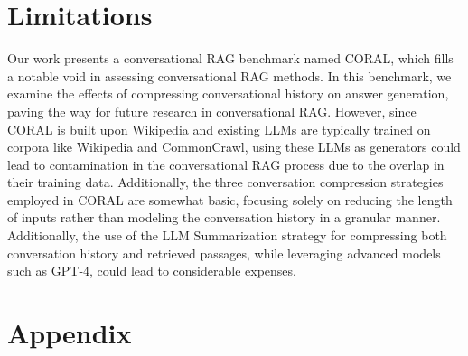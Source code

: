 \documentclass[11pt]{article}
\begin{document}
\section*{Limitations}

Our work presents a conversational RAG benchmark named CORAL, which fills a notable void in assessing conversational RAG methods. In this benchmark, we examine the effects of compressing conversational history on answer generation, paving the way for future research in conversational RAG. However, since CORAL is built upon Wikipedia and existing LLMs are typically trained on corpora like Wikipedia and CommonCrawl, using these LLMs as generators could lead to contamination in the conversational RAG process due to the overlap in their training data. Additionally, the three conversation compression strategies employed in CORAL are somewhat basic, focusing solely on reducing the length of inputs rather than modeling the conversation history in a granular manner. Additionally, the use of the LLM Summarization strategy for compressing both conversation history and retrieved passages, while leveraging advanced models such as GPT-4, could lead to considerable expenses.


%

\appendix





\clearpage
\section*{Appendix}
\end{document}
